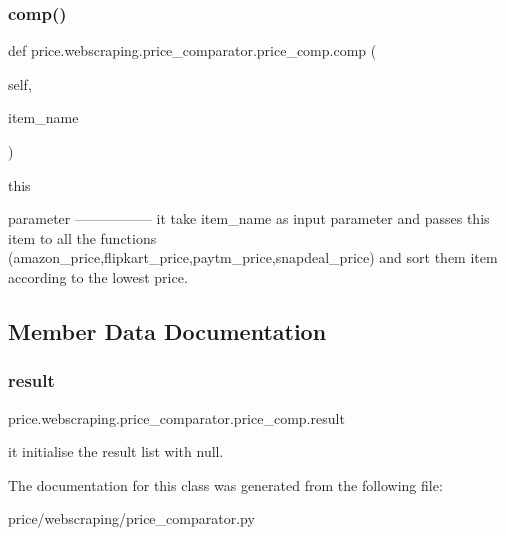 \subsubsection{\texorpdfstring{comp()}{comp()}}
{\footnotesize\ttfamily def price.\+webscraping.\+price\+\_\+comparator.\+price\+\_\+comp.\+comp (\begin{DoxyParamCaption}\item[{}]{self,  }\item[{}]{item\+\_\+name }\end{DoxyParamCaption})}

\begin{DoxyVerb}this

parameter
-----------------
it take item_name as input parameter and passes this item to all the functions (amazon_price,flipkart_price,paytm_price,snapdeal_price)
and sort them item according to the lowest price.
\end{DoxyVerb}
 

\subsection{Member Data Documentation}
\mbox{\label{classprice_1_1webscraping_1_1price__comparator_1_1price__comp_a0df412f91db90a50a11c6e2f80adc7d5}} 
\subsubsection{\texorpdfstring{result}{result}}
{\footnotesize\ttfamily price.\+webscraping.\+price\+\_\+comparator.\+price\+\_\+comp.\+result\hspace{0.3cm}{\ttfamily [static]}}

\begin{DoxyVerb}it initialise the result list with null.
\end{DoxyVerb}
 

The documentation for this class was generated from the following file\+:\begin{DoxyCompactItemize}
\item 
price/webscraping/price\+\_\+comparator.\+py\end{DoxyCompactItemize}
